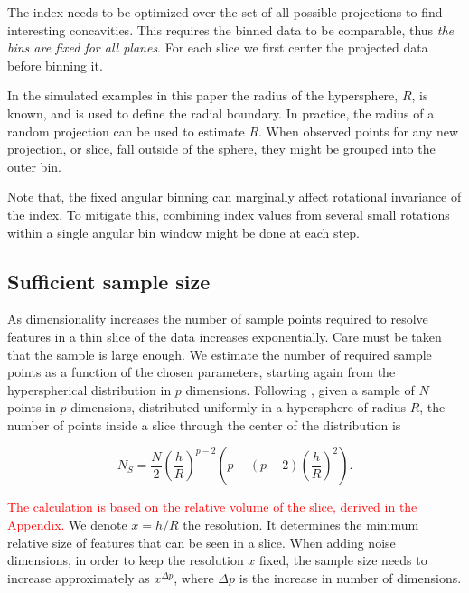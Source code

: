 \documentclass[]{interact}
\theoremstyle{plain}%
\theoremstyle{definition}
\theoremstyle{remark}
\begin{document}
The index needs to be optimized over the set of all possible projections
to find interesting concavities. This requires the binned data to be
comparable, thus \emph{the bins are fixed for all planes}. For each
slice we first center the projected data before binning it.

In the simulated examples in this paper the radius of the hypersphere,
\(R\), is known, and is used to define the radial boundary. In practice,
the radius of a random projection can be used to estimate \(R\). When
observed points for any new projection, or slice, fall outside of the
sphere, they might be grouped into the outer bin.

Note that, the fixed angular binning can marginally affect rotational
invariance of the index. To mitigate this, combining index values from
several small rotations within a single angular bin window might be done
at each step.

\hypertarget{sufficient-sample-size}{%
\subsection{\texorpdfstring{Sufficient sample size
\label{sec:size}}{Sufficient sample size }}\label{sufficient-sample-size}}

As dimensionality increases the number of sample points required to
resolve features in a thin slice of the data increases exponentially.
Care must be taken that the sample is large enough. We estimate the
number of required sample points as a function of the chosen parameters,
starting again from the hyperspherical distribution in \(p\) dimensions.
Following \citet{laa2019slice}, given a sample of \(N\) points in \(p\)
dimensions, distributed uniformly in a hypersphere of radius \(R\), the
number of points inside a slice through the center of the distribution
is

\begin{equation}
N_S = \frac{N}{2} \left(\frac{h}{R}\right)^{p-2} \left(p - (p-2)\left(\frac{h}{R}\right)^{2}\right).
\label{eq:count}
\end{equation}

\noindent \textcolor{red}{The calculation is based on the relative volume of the slice, derived in the Appendix.}
We denote \(x=h/R\) the resolution. It determines the minimum relative
size of features that can be seen in a slice. When adding noise
dimensions, in order to keep the resolution \(x\) fixed, the sample size
needs to increase approximately as \(x^{\Delta p}\), where \(\Delta p\)
is the increase in number of dimensions.
\end{document}
